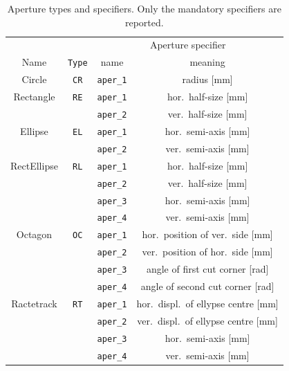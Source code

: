 \begin{center}
\begin{longtable}{|c|c|c|c|}%
    \caption{Aperture types and specifiers. Only the mandatory specifiers are reported.}
    \label{tab:apeSpecs} \\*
    \hline
    \rowcolor{blue!30}
    & & \multicolumn{2}{|c|}{Aperture specifier} \\*
    \rowcolor{blue!30}
    Name & \texttt{Type} & name & meaning \\*
    \hline
    \endfirsthead

    Circle  & \texttt{CR} & \texttt{aper\_1} & radius [mm] \\*
    \hline

    Rectangle & \texttt{RE} & \texttt{aper\_1} & hor.~half-size [mm] \\*
    & & \texttt{aper\_2} & ver.~half-size [mm] \\*
    \hline

    Ellipse & \texttt{EL} & \texttt{aper\_1} & hor.~semi-axis [mm] \\*
    & & \texttt{aper\_2} & ver.~semi-axis [mm] \\*
    \hline

    RectEllipse & \texttt{RL} & \texttt{aper\_1} & hor.~half-size [mm] \\*
    & & \texttt{aper\_2} & ver.~half-size [mm] \\*
    & & \texttt{aper\_3} & hor.~semi-axis [mm] \\*
    & & \texttt{aper\_4} & ver.~semi-axis [mm] \\*
    \hline

    Octagon & \texttt{OC} & \texttt{aper\_1} & hor.~position of ver.~side [mm] \\*
    & & \texttt{aper\_2} & ver.~position of hor.~side [mm] \\*
    & & \texttt{aper\_3} & angle of first cut corner [rad] \\*
    & & \texttt{aper\_4} & angle of second cut corner [rad] \\*
    \hline

    Ractetrack & \texttt{RT} & \texttt{aper\_1} & hor.~displ.~of ellypse centre [mm] \\*
    & & \texttt{aper\_2} & ver.~displ.~of ellypse centre [mm] \\*
    & & \texttt{aper\_3} & hor.~semi-axis [mm] \\*
    & & \texttt{aper\_4} & ver.~semi-axis [mm] \\*
    \hline


\end{longtable}
\end{center}
